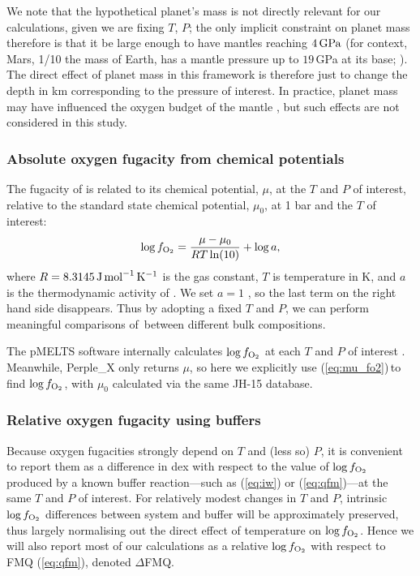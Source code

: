 We note that the hypothetical planet's mass is not directly relevant for our calculations, given we are fixing $T$, $P$; the only implicit constraint on planet mass therefore is that it be large enough to have mantles reaching $4\,{\rm GPa}$ (for context, Mars, 1/10 the mass of Earth, has a mantle pressure up to $19\,$GPa at its base; \citealt{stahler_seismic_2021}).  The direct effect of planet mass in this framework is therefore just to change the depth in km corresponding to the pressure of interest. In practice, planet mass may have influenced the oxygen budget of the mantle \citep[e.g.,][]{frost_redox_2008}, but such effects are not considered in this study.

\subsubsection{Absolute oxygen fugacity from chemical potentials}

The fugacity of  is related to its chemical potential, $\mu$, at the $T$ and $P$ of interest, relative to the standard state chemical potential, $\mu_0$, at 1 bar and the $T$ of interest:
\begin{equation}\label{eq:mu_fo2}
\log f_{\ce{O2}}= \frac{\mu - \mu_0} { R T \ln(10) } + \log a,
\end{equation}
where $R = 8.3145\,{\rm J\, mol}^{-1}\,{\rm K}^{-1}$ is the gas constant, $T$ is temperature in K, and $a$ is the thermodynamic activity of . We set $a = 1$ \citep{stolper_effects_2020}, so the last term on the right hand side disappears. Thus by adopting a fixed $T$ and $P$, we can perform meaningful comparisons of \fo\,between different bulk compositions.  

The pMELTS software internally calculates $\log f_{\ce{O2}}$ at each $T$ and $P$ of interest \citep[see][]{asimow_algorithmic_1998}. Meanwhile, Perple\_X only returns $\mu$, so here we explicitly use (\ref{eq:mu_fo2})\,to find $\log f_{\ce{O2}}$, with $\mu_0$ calculated via the same JH-15 database.


\subsubsection{Relative oxygen fugacity using buffers}

Because oxygen fugacities strongly depend on $T$ and (less so) $P$, it is convenient to report them as a difference in dex with respect to the value of $\log f_{\ce{O2}}$ produced by a known buffer reaction---such as (\ref{eq:iw}) or (\ref{eq:qfm})---at the same $T$ and $P$ of interest. For relatively modest changes in $T$ and $P$, intrinsic $\log f_{\ce{O2}}$ differences between system and buffer will be approximately preserved, thus largely normalising out the direct effect of temperature on $\log f_{\ce{O2}}$. 
Hence we will also report most of our calculations as a relative $\log f_{\ce{O2}}$ with respect to FMQ (\ref{eq:qfm}), denoted $\Delta$FMQ. 

